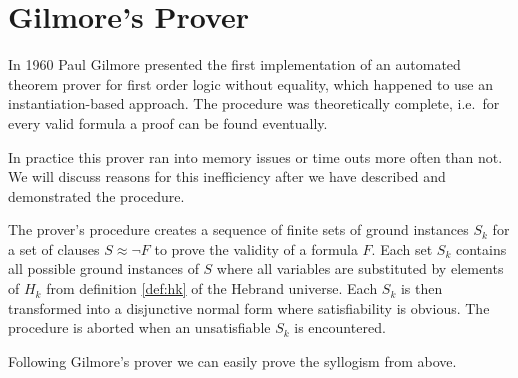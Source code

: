 \section{Gilmore's Prover}

In 1960 Paul Gilmore presented the first {\myem implementation} of an automated 
theorem prover \cite{5392528} for first order logic without equality,
which happened to use an instantiation-based approach. 
The procedure was theoretically complete, i.e.~for every valid formula 
a proof can be found eventually.

In practice this prover ran into memory issues or time outs more often than not.
We will discuss reasons for this inefficiency after we have described and demonstrated the procedure.

The prover's procedure 
creates a sequence of finite sets of ground instances $S_k$ 
for a set of clauses $S\approx\lnot F$ to prove the validity of a formula $F$.
Each set $S_k$ contains all possible ground instances of $S$ 
where all variables are substituted by elements of $H_k$
from definition \ref{def:hk} of the Hebrand universe.
Each $S_k$ is then transformed into a disjunctive normal form where satisfiability is obvious.
The procedure is aborted when an unsatisfiable $S_k$ is encountered.

Following Gilmore's prover we can easily prove the syllogism from above.

